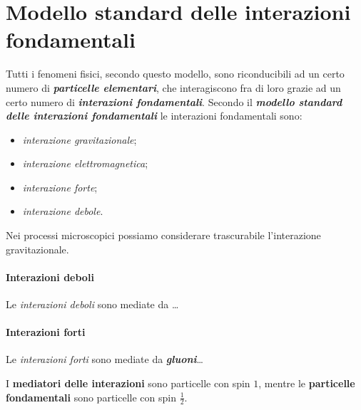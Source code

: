 \section{Modello standard delle interazioni fondamentali}
Tutti i fenomeni fisici, secondo questo modello, sono riconducibili ad un certo
numero di \textit{\textbf{particelle elementari}}, che interagiscono fra di
loro grazie ad un certo numero di \textit{\textbf{interazioni fondamentali}}.
Secondo il \textit{\textbf{modello standard delle interazioni fondamentali}} le
interazioni fondamentali sono:
\begin{itemize}
	\item \textit{interazione gravitazionale};
	\item \textit{interazione elettromagnetica};
	\item \textit{interazione forte};
	\item \textit{interazione debole}.
\end{itemize}
Nei processi microscopici possiamo considerare trascurabile l'interazione
gravitazionale.

\paragraph{Interazioni deboli}
Le \textit{interazioni deboli} sono mediate da \dots %

\paragraph{Interazioni forti}
Le \textit{interazioni forti} sono mediate da \textbf{\textit{gluoni}}\dots

I \textbf{mediatori delle interazioni} sono particelle con spin $1$, mentre le
\textbf{particelle fondamentali} sono particelle con spin $\frac{1}{2}$.

